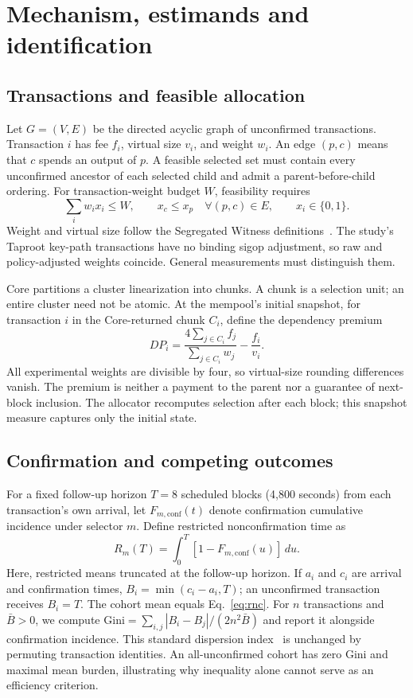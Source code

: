 \documentclass[conference]{IEEEtran}
\begin{document}
\section{Mechanism, estimands and identification}
\subsection{Transactions and feasible allocation}
Let $G=(V,E)$ be the directed acyclic graph of unconfirmed transactions. Transaction $i$ has fee $f_i$, virtual size $v_i$, and weight $w_i$. An edge $(p,c)$ means that $c$ spends an output of $p$. A feasible selected set must contain every unconfirmed ancestor of each selected child and admit a parent-before-child ordering. For transaction-weight budget $W$, feasibility requires
\begin{equation}
 \sum_i w_i x_i\leq W,\qquad x_c\leq x_p\quad\forall(p,c)\in E,
 \qquad x_i\in\{0,1\}.
 \label{eq:feasible}
\end{equation}
Weight and virtual size follow the Segregated Witness definitions~\cite{bip141}. The study's Taproot key-path transactions have no binding sigop adjustment, so raw and policy-adjusted weights coincide. General measurements must distinguish them.

Core partitions a cluster linearization into chunks. A chunk is a selection unit; an entire cluster need not be atomic. At the mempool's initial snapshot, for transaction $i$ in the Core-returned chunk $C_i$, define the dependency premium
\begin{equation}
 DP_i=\frac{4\sum_{j\in C_i} f_j}{\sum_{j\in C_i}w_j}-\frac{f_i}{v_i}.
 \label{eq:dp}
\end{equation}
All experimental weights are divisible by four, so virtual-size rounding differences vanish. The premium is neither a payment to the parent nor a guarantee of next-block inclusion. The allocator recomputes selection after each block; this snapshot measure captures only the initial state.

\subsection{Confirmation and competing outcomes}
For a fixed follow-up horizon $T=8$ scheduled blocks (4,800 seconds) from each transaction's own arrival, let $F_{m,\mathrm{conf}}(t)$ denote confirmation cumulative incidence under selector $m$. Define restricted nonconfirmation time as
\begin{equation}
 R_m(T)=\int_0^T[1-F_{m,\mathrm{conf}}(u)]\,du.
 \label{eq:rnc}
\end{equation}
Here, restricted means truncated at the follow-up horizon. If $a_i$ and $c_i$ are arrival and confirmation times, $B_i=\min(c_i-a_i,T)$; an unconfirmed transaction receives $B_i=T$. The cohort mean equals Eq.~\ref{eq:rnc}. For $n$ transactions and $\bar B>0$, we compute $\mathrm{Gini}=\sum_{i,j}|B_i-B_j|/(2n^2\bar B)$ and report it alongside confirmation incidence. This standard dispersion index~\cite{gastwirth1972} is unchanged by permuting transaction identities. An all-unconfirmed cohort has zero Gini and maximal mean burden, illustrating why inequality alone cannot serve as an efficiency criterion.
\end{document}
